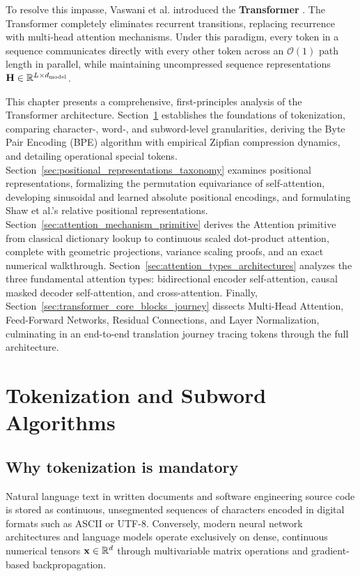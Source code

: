 \documentclass[../../../main.tex]{subfiles}
\begin{document}
To resolve this impasse, Vaswani et al. introduced the \textbf{Transformer} \cite{vaswani2017}. The Transformer completely eliminates recurrent transitions, replacing recurrence with multi-head attention mechanisms. Under this paradigm, every token in a sequence communicates directly with every other token across an $\mathcal{O}(1)$ path length in parallel, while maintaining uncompressed sequence representations $\mathbf{H} \in \mathbb{R}^{L \times d_{\text{model}}}$.

This chapter presents a comprehensive, first-principles analysis of the Transformer architecture. Section~\ref{sec:tokenization_taxonomy_bpe} establishes the foundations of tokenization, comparing character-, word-, and subword-level granularities, deriving the Byte Pair Encoding (BPE) algorithm with empirical Zipfian compression dynamics, and detailing operational special tokens. Section~\ref{sec:positional_representations_taxonomy} examines positional representations, formalizing the permutation equivariance of self-attention, developing sinusoidal and learned absolute positional encodings, and formulating Shaw et al.'s relative positional representations. Section~\ref{sec:attention_mechanism_primitive} derives the Attention primitive from classical dictionary lookup to continuous scaled dot-product attention, complete with geometric projections, variance scaling proofs, and an exact numerical walkthrough. Section~\ref{sec:attention_types_architectures} analyzes the three fundamental attention types: bidirectional encoder self-attention, causal masked decoder self-attention, and cross-attention. Finally, Section~\ref{sec:transformer_core_blocks_journey} dissects Multi-Head Attention, Feed-Forward Networks, Residual Connections, and Layer Normalization, culminating in an end-to-end translation journey tracing tokens through the full architecture.

\clearpage
\section{Tokenization and Subword Algorithms}
\label{sec:tokenization_taxonomy_bpe}

\subsection{Why tokenization is mandatory}
\label{subsec:why_tokenize}

Natural language text in written documents and software engineering source code is stored as continuous, unsegmented sequences of characters encoded in digital formats such as ASCII or UTF-8. Conversely, modern neural network architectures and language models operate exclusively on dense, continuous numerical tensors $\mathbf{x} \in \mathbb{R}^d$ through multivariable matrix operations and gradient-based backpropagation.
\end{document}

